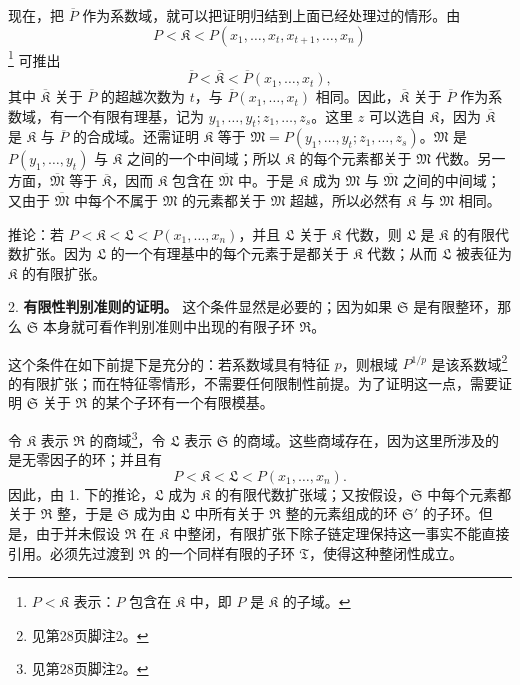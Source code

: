 现在，把 $\overline P$ 作为系数域，就可以把证明归结到上面已经处理过的情形。由
\[
 P<\mathfrak K<P(x_1,\ldots,x_t,x_{t+1},\ldots,x_n)
\]
\footnote{$P<\mathfrak K$ 表示：$P$ 包含在 $\mathfrak K$ 中，即 $P$ 是 $\mathfrak K$ 的子域。} 可推出
\[
 \overline P<\overline{\mathfrak K}<\overline P(x_1,\ldots,x_t),
\]
其中 $\overline{\mathfrak K}$ 关于 $\overline P$ 的超越次数为 $t$，与 $\overline P(x_1,\ldots,x_t)$ 相同。因此，$\overline{\mathfrak K}$ 关于 $\overline P$ 作为系数域，有一个有限有理基，记为 $y_1,\ldots,y_t; z_1,\ldots,z_s$。这里 $z$ 可以选自 $\mathfrak K$，因为 $\overline{\mathfrak K}$ 是 $\mathfrak K$ 与 $\overline P$ 的合成域。还需证明 $\mathfrak K$ 等于 $\mathfrak M=P(y_1,\ldots,y_t;z_1,\ldots,z_s)$。$\mathfrak M$ 是 $P(y_1,\ldots,y_t)$ 与 $\mathfrak K$ 之间的一个中间域；所以 $\mathfrak K$ 的每个元素都关于 $\mathfrak M$ 代数。另一方面，$\overline{\mathfrak M}$ 等于 $\overline{\mathfrak K}$，因而 $\mathfrak K$ 包含在 $\overline{\mathfrak M}$ 中。于是 $\mathfrak K$ 成为 $\mathfrak M$ 与 $\overline{\mathfrak M}$ 之间的中间域；又由于 $\overline{\mathfrak M}$ 中每个不属于 $\mathfrak M$ 的元素都关于 $\mathfrak M$ 超越，所以必然有 $\mathfrak K$ 与 $\mathfrak M$ 相同。

推论：若 $P<\mathfrak K<\mathfrak L<P(x_1,\ldots,x_n)$，并且 $\mathfrak L$ 关于 $\mathfrak K$ 代数，则 $\mathfrak L$ 是 $\mathfrak K$ 的有限代数扩张。因为 $\mathfrak L$ 的一个有理基中的每个元素于是都关于 $\mathfrak K$ 代数；从而 $\mathfrak L$ 被表征为 $\mathfrak K$ 的有限扩张。

2. \textbf{有限性判别准则的证明。} 这个条件显然是必要的；因为如果 $\mathfrak S$ 是有限整环，那么 $\mathfrak S$ 本身就可看作判别准则中出现的有限子环 $\mathfrak R$。

这个条件在如下前提下是充分的：若系数域具有特征 $p$，则根域 $P^{1/p}$ 是该系数域\footnote{见第28页脚注2。} 的有限扩张；而在特征零情形，不需要任何限制性前提。为了证明这一点，需要证明 $\mathfrak S$ 关于 $\mathfrak R$ 的某个子环有一个有限模基。

令 $\mathfrak K$ 表示 $\mathfrak R$ 的商域\footnote{见第28页脚注2。}，令 $\mathfrak L$ 表示 $\mathfrak S$ 的商域。这些商域存在，因为这里所涉及的是无零因子的环；并且有
\[
 P<\mathfrak K<\mathfrak L<P(x_1,\ldots,x_n).
\]
因此，由 1. 下的推论，$\mathfrak L$ 成为 $\mathfrak K$ 的有限代数扩张域；又按假设，$\mathfrak S$ 中每个元素都关于 $\mathfrak R$ 整，于是 $\mathfrak S$ 成为由 $\mathfrak L$ 中所有关于 $\mathfrak R$ 整的元素组成的环 $\mathfrak S'$ 的子环。但是，由于并未假设 $\mathfrak R$ 在 $\mathfrak K$ 中整闭，有限扩张下除子链定理保持这一事实不能直接引用。必须先过渡到 $\mathfrak R$ 的一个同样有限的子环 $\mathfrak T$，使得这种整闭性成立。

